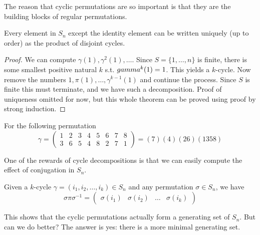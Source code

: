   The reason that cyclic permutations are so important is that they are the building blocks of regular permutations. 

  \begin{theorem}
    Every element in $S_n$ except the identity element can be written uniquely (up to order) as the product of disjoint cycles. 
  \end{theorem}
  \begin{proof}
    We can compute $\gamma(1), \gamma^2 (1), \ldots$. Since $S = \{1, \ldots, n\}$ is finite, there is some smallest positive natural $k$ s.t. $\\gamma^k (1) = 1$. This yields a $k$-cycle. Now remove the numbers $1, \pi(1), \ldots, \gamma^{k-1} (1)$ and continue the process. Since $S$ is finite this must terminate, and we have such a decomposition. Proof of uniqueness omitted for now, but this whole theorem can be proved using proof by strong induction.  
  \end{proof}

  \begin{example}
    For the following permutation
    \begin{equation}
      \gamma = \begin{pmatrix} 
        1 & 2 & 3 & 4 & 5 & 6 & 7 & 8 \\ 
        3 & 6 & 5 & 4 & 8 & 2 & 7 & 1 
      \end{pmatrix} = (7)(4)(26)(1358)
    \end{equation} 
  \end{example}

  One of the rewards of cycle decompositions is that we can easily compute the effect of conjugation in $S_n$. 

  \begin{lemma}
    Given a $k$-cycle $\gamma = (i_1, i_2, \ldots, i_k) \in S_n$ and any permutation $\sigma \in S_n$, we have 
    \begin{equation}
      \sigma \pi \sigma^{-1} = \begin{pmatrix} \sigma(i_1) & \sigma(i_2) & \ldots & \sigma(i_k) \end{pmatrix}
    \end{equation}
  \end{lemma}

  This shows that the cyclic permutations actually form a generating set of $S_n$. But can we do better? The answer is yes: there is a more minimal generating set. 

